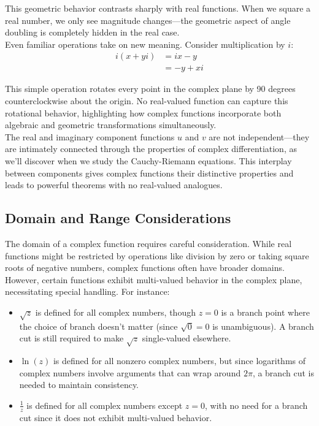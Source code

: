 \noindent This geometric behavior contrasts sharply with real functions. When we square a real number, we only see magnitude changes—the geometric aspect of angle doubling is completely hidden in the real case. \\

\noindent Even familiar operations take on new meaning. Consider multiplication by $i$:
\begin{align*}
i(x + yi) &= ix - y \\
&= -y + xi
\end{align*}

\noindent This simple operation rotates every point in the complex plane by 90 degrees counterclockwise about the origin. No real-valued function can capture this rotational behavior, highlighting how complex functions incorporate both algebraic and geometric transformations simultaneously. \\

\noindent The real and imaginary component functions $u$ and $v$ are not independent—they are intimately connected through the properties of complex differentiation, as we'll discover when we study the Cauchy-Riemann equations. This interplay between components gives complex functions their distinctive properties and leads to powerful theorems with no real-valued analogues.

\subsection*{Domain and Range Considerations} 

\noindent The domain of a complex function requires careful consideration. While real functions might be restricted by operations like division by zero or taking square roots of negative numbers, complex functions often have broader domains. However, certain functions exhibit multi-valued behavior in the complex plane, necessitating special handling. For instance:

\begin{itemize}
\item $\sqrt{z}$ is defined for all complex numbers, though $z = 0$ is a branch point where the choice of branch doesn't matter (since $\sqrt{0} = 0$ is unambiguous). A branch cut is still required to make $\sqrt{z}$ single-valued elsewhere.
\item $\ln(z)$ is defined for all nonzero complex numbers, but since logarithms of complex numbers involve arguments that can wrap around $2\pi$, a branch cut is needed to maintain consistency.
\item $\frac{1}{z}$ is defined for all complex numbers except $z = 0$, with no need for a branch cut since it does not exhibit multi-valued behavior.
\end{itemize}

